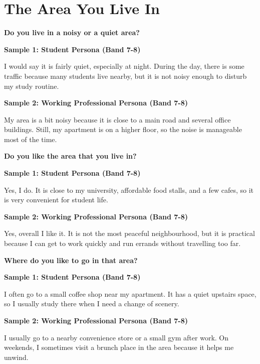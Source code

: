 \newpage

\section{The Area You Live In}
\begin{ieltsquestion}
\textbf{Do you live in a noisy or a quiet area?}
\end{ieltsquestion}
\textbf{Sample 1: Student Persona (Band 7-8)}

I would say it is fairly quiet, especially at night. During the day, there is some traffic because many students live nearby, but it is not noisy enough to disturb my study routine.

\textbf{Sample 2: Working Professional Persona (Band 7-8)}

My area is a bit noisy because it is close to a main road and several office buildings. Still, my apartment is on a higher floor, so the noise is manageable most of the time.

\separator

\begin{ieltsquestion}
\textbf{Do you like the area that you live in?}
\end{ieltsquestion}
\textbf{Sample 1: Student Persona (Band 7-8)}

Yes, I do. It is close to my university, affordable food stalls, and a few cafes, so it is very convenient for student life.

\textbf{Sample 2: Working Professional Persona (Band 7-8)}

Yes, overall I like it. It is not the most peaceful neighbourhood, but it is practical because I can get to work quickly and run errands without travelling too far.

\separator

\begin{ieltsquestion}
\textbf{Where do you like to go in that area?}
\end{ieltsquestion}
\textbf{Sample 1: Student Persona (Band 7-8)}

I often go to a small coffee shop near my apartment. It has a quiet upstairs space, so I usually study there when I need a change of scenery.

\textbf{Sample 2: Working Professional Persona (Band 7-8)}

I usually go to a nearby convenience store or a small gym after work. On weekends, I sometimes visit a brunch place in the area because it helps me unwind.

